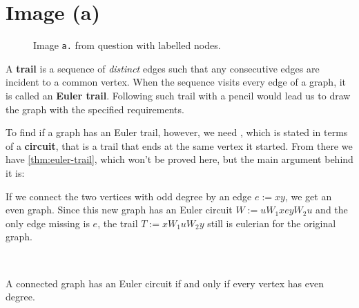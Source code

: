 \section{Image (a)}

\begin{wrapfigure}{l}{0.5\textwidth}
    \centering

    \caption{Image \texttt{a.} from question with labelled nodes.}
    \label{fig:graph-a}
\end{wrapfigure}

A \textbf{trail} is a sequence of \textit{distinct} edges such that any consecutive edges are incident to a common vertex. When the sequence visits every edge of a graph, it is called an \textbf{Euler trail}. Following such trail with a pencil would lead us to draw the graph with the specified requirements.

To find if a graph has an Euler trail, however, we need , which is stated in terms of a \textbf{circuit}, that is a trail that ends at the same vertex it started. From there we have \cref{thm:euler-trail}, which won't be proved here, but the main argument behind it is:

If we connect the two vertices with odd degree by an edge $e := x y$, we get an even graph. Since this new graph has an Euler circuit $W := u W_1 x e y W_2 u$ and the only edge missing is $e$, the trail $T := x W_1 u W_2 y$ still is eulerian for the original graph.

~

\begin{theorem} \label{thm:euler-circuit}
    A connected graph has an Euler circuit if and only if every vertex has even degree.
\end{theorem}

